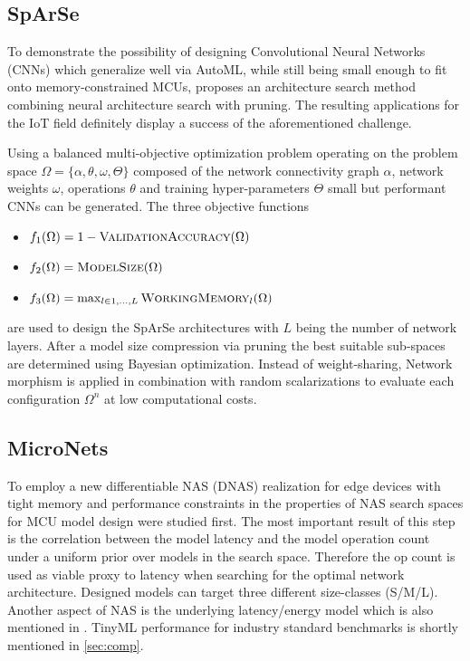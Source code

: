 \documentclass[10pt,        %
               a4paper,     %
               journal,     %
               ]{IEEEtran}
\begin{document}
\subsection{SpArSe}

To demonstrate the possibility of designing Convolutional Neural Networks (CNNs) which generalize well via AutoML, while still being small enough to fit onto memory-constrained MCUs, \cite{sparse2019} proposes an architecture search method combining neural architecture search with pruning. The resulting applications for the IoT field definitely display a success of the aforementioned challenge. 

Using a balanced multi-objective optimization problem operating on the problem space $\Omega=\{\alpha,\theta,\omega,\Theta\}$ composed of the network connectivity graph $\alpha$, network weights $\omega$, operations $\theta$ and training hyper-parameters $\Theta$ small but performant CNNs can be generated. The three objective functions

\begin{itemize}
    \item $f_1(\Omega)=1-\textsc{ValidationAccuracy}(\Omega)$
    \item $f_2(\Omega)=\textsc{ModelSize}(\Omega)$
    \item $f_3(\Omega) =\max_{l \in 1,\ldots,L} \textsc{WorkingMemory}_l(\Omega)$
\end{itemize}

 are used to design the SpArSe architectures with $L$ being the number of network layers. After a model size compression via pruning the best suitable sub-spaces are determined using Bayesian optimization. Instead of weight-sharing, Network morphism is applied in combination with random scalarizations  \cite{sparse2019} to evaluate each configuration $\Omega^n$ at low computational costs.

\subsection{MicroNets}

To employ a new differentiable NAS (DNAS) realization for edge devices with tight memory and performance constraints in \cite{micronets2020} the properties of NAS search spaces for MCU model design were studied first. The most important result of this step is the correlation between the model latency and the model operation count under a uniform prior over models in the search space. Therefore the op count is used as viable proxy to latency when searching for the optimal network architecture. Designed models can target three different size-classes (S/M/L). Another aspect of NAS is the underlying latency/energy model which is also mentioned in \cite{micronets2020}. TinyML performance for industry standard benchmarks is shortly mentioned in \ref{sec:comp}.
\end{document}

